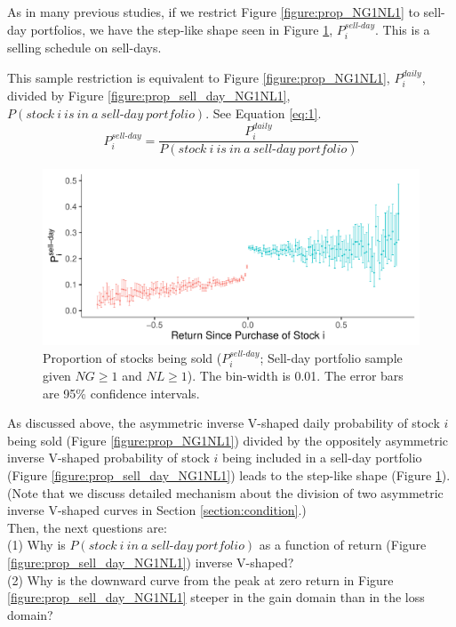 \documentclass[11pt, a4paper]{article}
\begin{document}
As in many previous studies, if we restrict Figure \ref{figure:prop_NG1NL1} to sell-day portfolios, we have the step-like shape seen in Figure \ref{figure:prop_sell_days_NG1NL1}, $P^{sell\mbox{-}day}_{i}$. This is a selling schedule on sell-days.

This sample restriction is equivalent to Figure \ref{figure:prop_NG1NL1}, $P^{daily}_{i}$, divided by Figure \ref{figure:prop_sell_day_NG1NL1}, $P(stock~i~is~in~a~sell\mbox{-}day~portfolio)$. See Equation \ref{eq:1}.\\

\begin{equation}
	\label{eq:1}
P^{sell\mbox{-}day}_{i} = \frac{P^{daily}_{i}}{P(stock~i~is~in~a~sell\mbox{-}day~portfolio)}
\end{equation}


\begin{figure}[H]
	\centering
	\includegraphics[width=0.8\columnwidth]{barc_schedule_sell_day_NG1_NL1_3.pdf}
	\caption{\small Proportion of stocks being sold ($P^{sell\mbox{-}day}_{i}$; Sell-day portfolio sample given $NG\geq1$ and $NL\geq1$). The bin-width is 0.01. The error bars are 95\% confidence intervals.}
	\label{figure:prop_sell_days_NG1NL1}
\end{figure}

As discussed above, the asymmetric inverse V-shaped daily probability of stock $i$ being sold (Figure \ref{figure:prop_NG1NL1}) divided by the oppositely asymmetric inverse V-shaped probability of stock $i$ being included in a sell-day portfolio (Figure \ref{figure:prop_sell_day_NG1NL1}) leads to the step-like shape (Figure \ref{figure:prop_sell_days_NG1NL1}). (Note that we discuss detailed mechanism about the division of two asymmetric inverse V-shaped curves in Section \ref{section:condition}.) \\

Then, the next questions are:\\
(1) Why is $P(stock~i~in~a~sell\mbox{-}day~portfolio)$ as a function of return (Figure \ref{figure:prop_sell_day_NG1NL1}) inverse V-shaped?\\
(2) Why is the downward curve from the peak at zero return in Figure \ref{figure:prop_sell_day_NG1NL1} steeper in the gain domain than in the loss domain?\\
\end{document}
